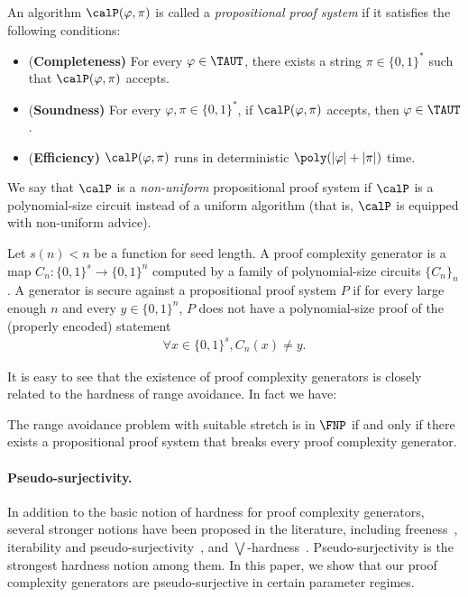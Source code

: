\begin{definition}
    An algorithm $\calP(\varphi, \pi)$ is called a \emph{propositional proof system} if it satisfies the following conditions:\begin{itemize}[align=left]
        \item {(\bf Completeness)} For every $\varphi \in \TAUT$, there exists a string $\pi\in\{0, 1\}^*$ such that $\calP(\varphi, \pi)$ accepts.
        \item {(\bf Soundness)} For every $\varphi, \pi \in \{0, 1\}^*$, if $\calP(\varphi, \pi)$ accepts, then $\varphi \in \TAUT$.
        \item {(\bf Efficiency)} $\calP(\varphi, \pi)$ runs in deterministic $\poly(|\varphi| + |\pi|)$ time.
    \end{itemize}
    We say that $\calP$ is a \emph{non-uniform} propositional proof system if $\calP$ is a polynomial-size circuit instead of a uniform algorithm (that is, $\calP$ is equipped with non-uniform advice).
\end{definition}

\begin{definition}
    Let $s(n)<n$ be a function for seed length. A proof complexity generator is a map $C_n:\{0,1\}^s\to \{0,1\}^n$ computed by a family of polynomial-size circuits $\{C_n\}_n$. A generator is secure against a propositional proof system $P$ if for every large enough $n$ and every $y\in\{0,1\}^n$, $P$ does not have a polynomial-size proof of the (properly encoded) statement
    \begin{align*}
        \forall x\in \{0,1\}^s,C_n(x)\neq y.
    \end{align*}
\end{definition}

It is easy to see that the existence of proof complexity generators is closely related to the hardness of range avoidance. In fact we have:

\begin{theorem}
    The range avoidance problem with suitable stretch is in $\FNP$ if and only if there exists a propositional proof system that breaks every proof complexity generator.
\end{theorem}


\paragraph{Pseudo-surjectivity.} In addition to the basic notion of hardness for proof complexity generators, several stronger notions have been proposed in the literature, including freeness~\cite{krajivcek2001tautologies}, iterability and pseudo-surjectivity~\cite{Krajicek04}, and $\bigvee$-hardness~\cite{krajivcek2024existence}. Pseudo-surjectivity is the strongest hardness notion among them. In this paper, we show that our proof complexity generators are pseudo-surjective in certain parameter regimes.

